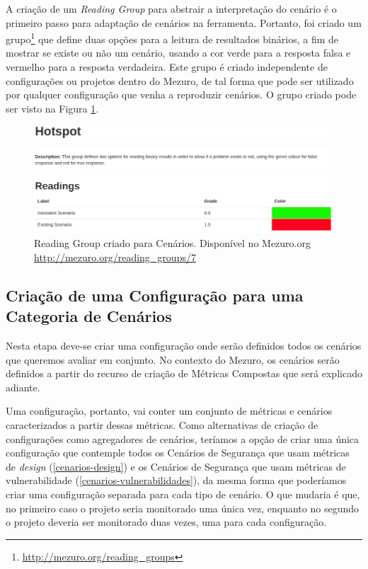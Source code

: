 A criação de um \emph{Reading Group} para abstrair a interpretação do cenário é o primeiro passo para adaptação de cenários na ferramenta. Portanto, foi criado um grupo\footnote{\url{http://mezuro.org/reading_groups}} que define duas opções para a leitura de resultados binários, a fim de mostrar se existe ou não um cenário, usando a cor verde para a resposta falsa e vermelho para a resposta verdadeira. Este grupo é criado independente de configurações ou projetos dentro do Mezuro, de tal forma que pode ser utilizado por qualquer configuração que venha a reproduzir cenários. O grupo criado pode ser visto na Figura \ref{reading_group}.

\graphicspath{{figuras/}}
\begin{figure}[h]
\centering
\includegraphics[width=1.0\textwidth]{reading_group}
\caption{Reading Group criado para Cenários. Disponível no Mezuro.org \url{http://mezuro.org/reading_groups/7}}
\label{reading_group}
\end{figure}

\subsection{Criação de uma Configuração para uma Categoria de Cenários}

Nesta etapa deve-se criar uma configuração onde serão definidos todos os cenários que queremos avaliar em conjunto. No contexto do Mezuro, os cenários serão definidos a partir do recurso de criação de Métricas Compostas que será explicado adiante.

Uma configuração, portanto, vai conter um conjunto de métricas e cenários caracterizados a partir dessas métricas. Como alternativas de criação de configurações como agregadores de cenários, teríamos a opção de criar uma única configuração que contemple todos os Cenários de Segurança que usam métricas de \emph{design} (\ref{cenarios-design}) e os Cenários de Segurança que usam métricas de vulnerabilidade (\ref{cenarios-vulnerabilidades}), da mesma forma que poderíamos criar uma configuração separada para cada tipo de cenário. O que mudaria é que, no primeiro caso o projeto seria monitorado uma única vez, enquanto no segundo o projeto deveria ser monitorado duas vezes, uma para cada configuração. 

